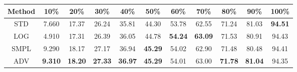\documentclass{standalone}
\begin{document}
\begin{tabular}{c|cccccccccc}
      \toprule
      Method & 10\% & 20\% & 30\% & 40\% & 50\% & 60\% & 70\% & 80\% & 90\% & 100\% \\
      \midrule
STD & 7.660 & 17.37 & 26.24 & 35.81 & 44.30 & 53.78 & 62.55 & 71.24 & 81.03 & \textbf{94.51}\\
LOG & 4.910 & 17.31 & 26.39 & 36.05 & 44.78 & \textbf{54.24} & \textbf{63.09} & 71.53 & 80.91 & 94.43\\
SMPL & 9.290 & 18.17 & 27.17 & 36.94 & \textbf{45.29} & 54.02 & 62.90 & 71.48 & 80.48 & 94.41\\
ADV & \textbf{9.310} & \textbf{18.20} & \textbf{27.33} & \textbf{36.97} & \textbf{45.29} & 54.01 & 63.00 & \textbf{71.78} & \textbf{81.04} & 94.35\\
  \bottomrule
\end{tabular}
\end{document}
